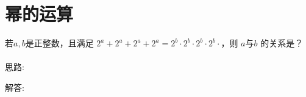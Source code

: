 \section{幂的运算}

\item {
    若$a,b$是正整数，且满足 $2^a + 2^a + 2^a + 2^a = 2^b\cdot 2^b\cdot 2^b\cdot 2^b\cdot$，则 $a$与$b$ 的关系是？\\
    \ifshowSolution
    \fangsong{}
    \\
    思路: 

    解答:
    \else
        \\ \\ \\
    \fi
}

\begin{comment}


\item {
    $\bigstar\bigstar\bigstar\bigstar$
    (用科学记数法)一个正方体集装箱的棱长为 $0. 8 \rm{m}$. \\
    (2) 若有一个小立方块的棱长为$2\times 10^{-3} $ m, 则需要多少个这样的小立方块才能将集装箱装满？
    \ifshowSolution
    \fangsong\zihao{4}
    \\
    思路: 问题(2)注意简便运算. 

    解答:
    \begin{align*}
        \frac{0. 8^3} {(2\times 10^{-3})^3} &= \frac{0. 8^3} {8\times 10^{-9}}\\
        &= \frac{0. 064} {\frac{1}{10^9}}\\
        &= 0. 064\times 10^9\\
        &= 6. 4\times 10^{-2}\times 10^9\\
        &= 6. 4\times 10^7\\
    \end{align*}
    \else
        \\ \\ \\
    \fi
}

\item {
    当 $ x=7, y=-\frac{1}{7}$ 时, 求 $x^{4n+1}\cdot y^{4n+2}$ ($n$为整数)的值. 
    \ifshowSolution
        \fangsong\zihao{4}
        \\
        思路: 观察到$xy=-1$, 让将$x$和$y$凑成一对, 相乘. 直接将$x, y$的值代入表达式中进行计算. 

        解答: 
        \begin{align*}
            \mbox{原式} &= 7^{4n+1}\cdot \left(-\frac{1}{7}\right) ^{4n+2}\\
            &= [7\times(-\frac{1}{7})]^{4n+1} \cdot(-\frac{1}{7})\\
            &= (-1)^{4n+1} \cdot(-\frac{1}{7})\\
            &= \frac{1}{7}. 
        \end{align*}
    \else
        \\ \\ \\
    \fi
}


\end{comment}
